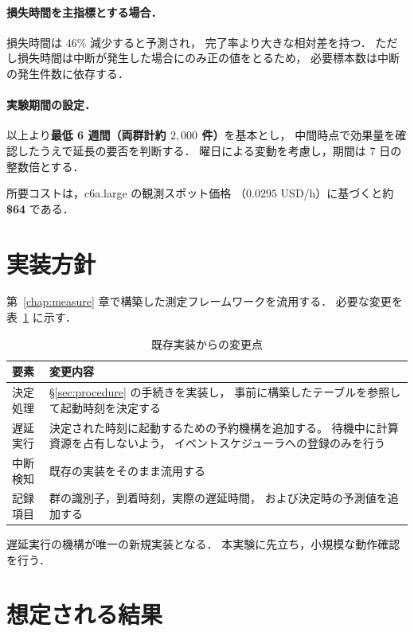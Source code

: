 \documentclass[11pt,a4paper]{ltjsreport}
\begin{document}
\paragraph{損失時間を主指標とする場合．}
損失時間は $46\%$ 減少すると予測され，
完了率より大きな相対差を持つ．
ただし損失時間は中断が発生した場合にのみ正の値をとるため，
必要標本数は中断の発生件数に依存する．

\paragraph{実験期間の設定．}
以上より\textbf{最低 6 週間（両群計約 $2{,}000$ 件）}を基本とし，
中間時点で効果量を確認したうえで延長の要否を判断する．
曜日による変動を考慮し，期間は 7 日の整数倍とする．

所要コストは，c6a.large の観測スポット価格
（$0.0295$ USD/h）に基づくと約 \textbf{\$64} である．

\section{実装方針}

第~\ref{chap:measure} 章で構築した測定フレームワークを流用する．
必要な変更を表~\ref{tab:impl} に示す．

\begin{table}[htbp]
\centering
\caption{既存実装からの変更点}
\label{tab:impl}
\small
\begin{tabularx}{\textwidth}{@{}lX@{}}
\toprule
要素 & 変更内容 \\
\midrule
決定処理 & \S\ref{sec:procedure} の手続きを実装し，
           事前に構築したテーブルを参照して起動時刻を決定する \\
\addlinespace
遅延実行 & 決定された時刻に起動するための予約機構を追加する。
           待機中に計算資源を占有しないよう，
           イベントスケジューラへの登録のみを行う \\
\addlinespace
中断検知 & 既存の実装をそのまま流用する \\
\addlinespace
記録項目 & 群の識別子，到着時刻，実際の遅延時間，
           および決定時の予測値を追加する \\
\bottomrule
\end{tabularx}
\end{table}

遅延実行の機構が唯一の新規実装となる．
本実験に先立ち，小規模な動作確認を行う．

\section{想定される結果}
\end{document}
